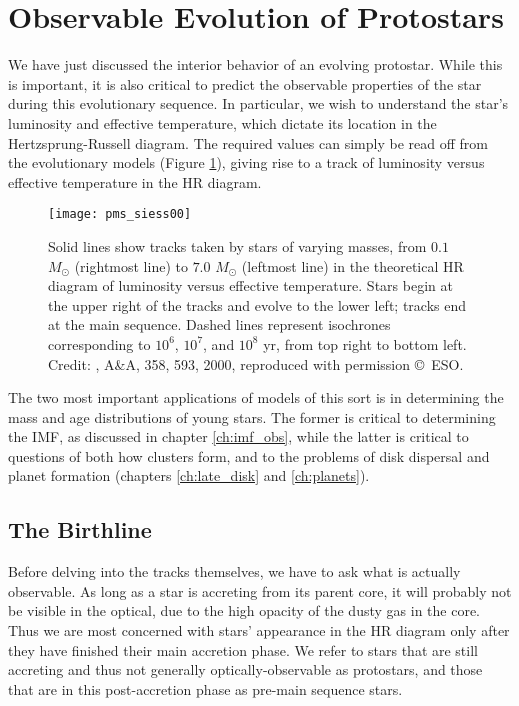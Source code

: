 \section{Observable Evolution of Protostars}


We have just discussed the interior behavior of an evolving protostar. While this is important, it is also critical to predict the observable properties of the star during this evolutionary sequence. In particular, we wish to understand the star's luminosity and effective temperature, which dictate its location in the Hertzsprung-Russell diagram. The required values can simply be read off from the evolutionary models (Figure \ref{fig:pms_siess00}), giving rise to a track of luminosity versus effective temperature in the HR diagram.

\begin{figure}
\texttt{[image: pms\_siess00]}
\caption[Pre-main sequence evolutionary tracks]{
\label{fig:pms_siess00}
Solid lines show tracks taken by stars of varying masses, from $0.1$ $M_\odot$ (rightmost line) to $7.0$ $M_\odot$ (leftmost line) in the theoretical HR diagram of luminosity versus effective temperature. Stars begin at the upper right of the tracks and evolve to the lower left; tracks end at the main sequence. Dashed lines represent isochrones corresponding to $10^6$, $10^7$, and $10^8$ yr, from top right to bottom left. Credit: \citeauthor{siess00a}, A\&A, 358, 593, 2000, reproduced
with permission \copyright\, ESO.
}
\end{figure}

The two most important applications of models of this sort is in determining the mass and age distributions of young stars. The former is critical to determining the IMF, as discussed in chapter \ref{ch:imf_obs}, while the latter is critical to questions of both how clusters form, and to the problems of disk dispersal and planet formation (chapters \ref{ch:late_disk} and \ref{ch:planets}).

\subsection{The Birthline}

Before delving into the tracks themselves, we have to ask what is actually observable. As long as a star is accreting from its parent core, it will probably not be visible in the optical, due to the high opacity of the dusty gas in the core. Thus we are most concerned with stars' appearance in the HR diagram only after they have finished their main accretion phase. We refer to stars that are still accreting and thus not generally optically-observable as protostars, and those that are in this post-accretion phase as pre-main sequence stars. 

